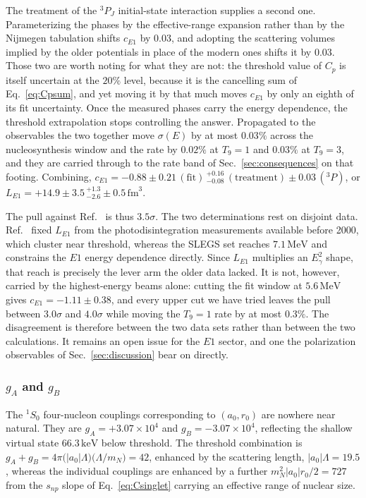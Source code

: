 \documentclass[
  aps,prd,twocolumn,nofootinbib,superscriptaddress,
  longbibliography,floatfix,preprintnumbers
]{revtex4-2}
\newcommand{\Egam}{E_{\gamma}}
\newcommand{\Eone}{E1}
\begin{document}
The treatment of the ${}^{3}P_{J}$ initial-state interaction supplies a second one.
Parameterizing the phases by the effective-range expansion rather than by the
Nijmegen tabulation shifts $c_{\Eone}$ by $0.03$, and adopting the scattering
volumes implied by the older potentials in place of the modern ones shifts it by
$0.03$. Those two are worth noting for what they are not: the threshold value of
$C_{p}$ is itself uncertain at the $20\%$ level, because it is the cancelling sum
of Eq.~\eqref{eq:Cpsum}, and yet moving it by that much moves $c_{\Eone}$ by only an
eighth of its fit uncertainty. Once the measured phases carry the energy
dependence, the threshold extrapolation stops controlling the answer. Propagated to
the observables the two together move $\sigma(E)$ by at most $0.03\%$ across the
nucleosynthesis window and the rate by $0.02\%$ at $T_{9}=1$ and $0.03\%$ at
$T_{9}=3$, and they are carried through to the rate band of
Sec.~\ref{sec:consequences} on that footing. Combining,
$c_{\Eone}=-0.88\pm0.21\,(\mathrm{fit})\,{}^{+0.16}_{-0.08}\,(\mathrm{treatment})
\pm0.03\,(^{3}P)$, or
$L_{\Eone}=+14.9\pm3.5\,{}^{+1.3}_{-2.6}\pm0.5\,\mathrm{fm}^{3}$.

The pull against Ref.~\cite{Rupak:1999rk} is thus $3.5\sigma$. The two determinations rest on disjoint data.
Ref.~\cite{Rupak:1999rk} fixed $L_{\Eone}$ from the photodisintegration measurements
available before 2000, which cluster near threshold, whereas the SLEGS set reaches
$7.1\,\mathrm{MeV}$ and constrains the $\Eone$ energy dependence directly. Since
$L_{\Eone}$ multiplies an $\Egam^{2}$ shape, that reach is precisely the lever arm the
older data lacked. It is not, however, carried by the highest-energy beams alone: cutting
the fit window at $5.6\,\mathrm{MeV}$ gives $c_{\Eone}=-1.11\pm0.38$, and every upper cut
we have tried leaves the pull between $3.0\sigma$ and $4.0\sigma$ while moving the
$T_{9}=1$ rate by at most $0.3\%$. The disagreement is therefore between the two data sets
rather than between the two calculations. It remains an
open issue for the $\Eone$ sector, and one the polarization observables of
Sec.~\ref{sec:discussion} bear on directly.

\subsubsection{$g_A$ and $g_B$}

The ${}^{1}S_{0}$ four-nucleon couplings corresponding to $(a_{0},r_{0})$ are nowhere near natural.  They are 
$g_{A}=+3.07\times10^{4}$ and $g_{B}=-3.07\times10^{4}$, reflecting the shallow
virtual state $66.3\,\mathrm{keV}$ below threshold. The threshold combination is
$g_{A}+g_{B}=4\pi\big(|a_{0}|\Lambda\big)\big(\Lambda/m_{N}\big)=42$, enhanced by
the scattering length, $|a_{0}|\Lambda=19.5$, whereas the individual couplings are enhanced by a further
$m_{N}^{2}|a_{0}|r_{0}/2=727$ from the $s_{np}$ slope of
Eq.~\eqref{eq:Csinglet} carrying an effective range of nuclear size.
\end{document}
